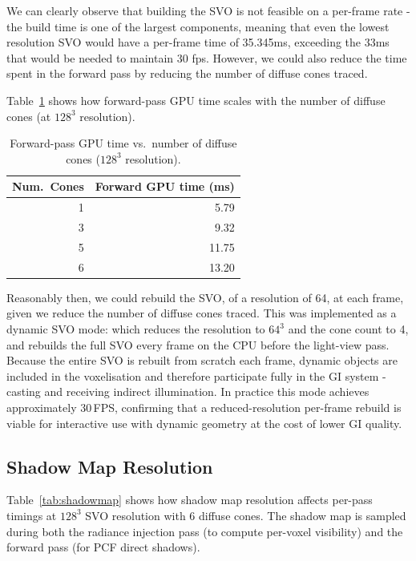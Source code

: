 \documentclass[12pt]{article}
\begin{document}
We can clearly observe that building the SVO is not feasible on a per-frame rate - the build time is one of the largest components, meaning that even the lowest resolution SVO would have a per-frame time of 35.345ms, exceeding the 33ms that would be needed to maintain 30 fps. However, we could also reduce the time spent in the forward pass by reducing the number of diffuse cones traced.

Table~\ref{tab:cones} shows how forward-pass GPU time scales with the number of diffuse cones (at $128^3$ resolution).

\begin{table}[H]
\centering
\caption{Forward-pass GPU time vs.\ number of diffuse cones ($128^3$ resolution).}
\label{tab:cones}
\begin{tabular}{rr}
\toprule
Num.\ Cones & Forward GPU time (ms) \\
\midrule
1 &  5.79 \\
3 &  9.32 \\
5 & 11.75 \\
6 & 13.20 \\
\bottomrule
\end{tabular}
\end{table}

Reasonably then, we could rebuild the SVO, of a resolution of 64, at each frame, given we reduce the number of diffuse cones traced. This was implemented as a dynamic SVO mode: which reduces the resolution to $64^3$ and the cone count to 4, and rebuilds the full SVO every frame on the CPU before the light-view pass. Because the entire SVO is rebuilt from scratch each frame, dynamic objects are included in the voxelisation and therefore participate fully in the GI system - casting and receiving indirect illumination. In practice this mode achieves approximately 30\,FPS, confirming that a reduced-resolution per-frame rebuild is viable for interactive use with dynamic geometry at the cost of lower GI quality.

\subsection{Shadow Map Resolution}

Table~\ref{tab:shadowmap} shows how shadow map resolution affects per-pass timings at $128^3$ SVO resolution with 6 diffuse cones. The shadow map is sampled during both the radiance injection pass (to compute per-voxel visibility) and the forward pass (for PCF direct shadows).
\end{document}

